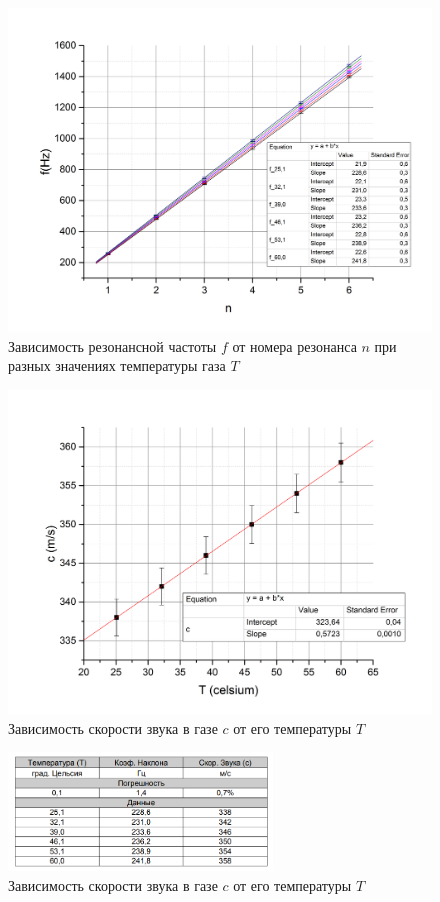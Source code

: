 \documentclass[a4paper,12pt]{article}
\newcounter{first}
\begin{document}
\setcounter{figure}{0}
\setcounter{first}{1}
\renewcommand{\figurename}{График}

\begin{figure}[htpb!]
\centering 
\includegraphics[width=120mm]{graph1.jpg}
\caption{Зависимость резонансной частоты $f$ от номера резонанса $n$ при разных значениях температуры газа $T$}
\end{figure}

\begin{figure}[htpb!]
\centering
\includegraphics[width=120mm]{graph2.jpg}
\caption{Зависимость скорости звука в газе $c$ от его температуры $T$}
\end{figure}

\setcounter{figure}{0} 
\renewcommand{\figurename}{Таблица}

\begin{figure}[htpb!]
\centering
\includegraphics[width=70mm]{table1.png}
\caption{Зависимость скорости звука в газе $c$ от его температуры $T$}
\end{figure}
\end{document}
